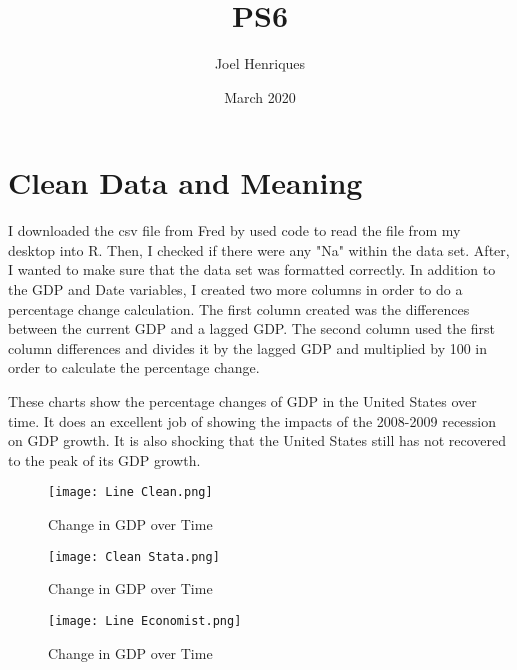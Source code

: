 \documentclass{article}
\title{PS6}
\author{Joel Henriques }
\date{March 2020}
\begin{document}
\maketitle

\section{Clean Data and Meaning}
I downloaded the csv file from Fred by used code to read the file from my desktop into R. Then, I checked if there were any "Na" within the data set. After, I wanted to make sure that the data set was formatted correctly. In addition to the GDP and Date variables, I created two more columns in order to do a percentage change calculation. The first column created was the differences between the current GDP and a lagged GDP. The second column used the first column differences and divides it by the lagged GDP and multiplied by 100 in order to calculate the percentage change. 


These charts show the percentage changes of GDP in the United States over time. It does an excellent job of showing the impacts of the 2008-2009 recession on GDP growth. It is also shocking that the United States still has not recovered to the peak of its GDP growth. 

\begin{figure}[hbt!]
\centering
\texttt{[image: Line Clean.png]}
\caption{Change in GDP over Time}
\label{fig1:Line Clean}


\texttt{[image: Clean Stata.png]}
\caption{Change in GDP over Time}
\label{fig2:Clean Stata}


\texttt{[image: Line Economist.png]}
\caption{Change in GDP over Time}
\label{fig2:Line Economist}
\end{figure}
\end{document}
